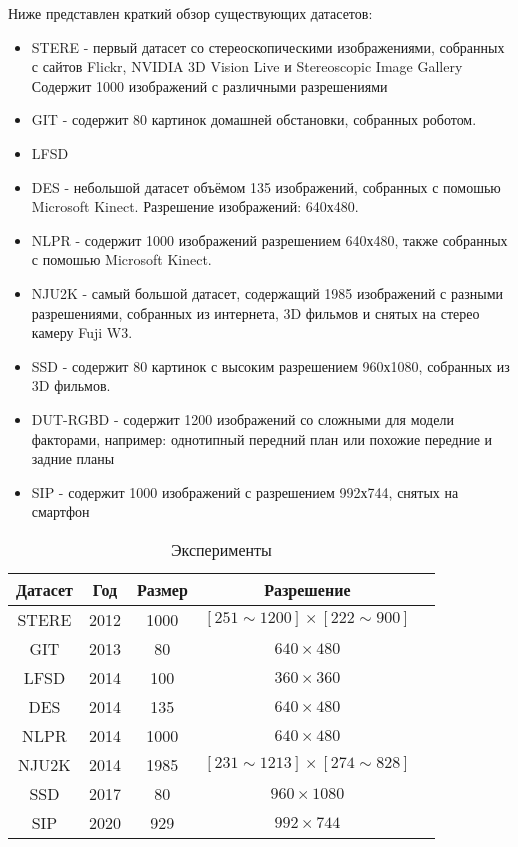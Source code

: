 Ниже представлен краткий обзор существующих датасетов:
\begin{itemize}
    \item STERE \cite{STERE} - первый датасет со стереоскопическими изображениями, собранных с сайтов Flickr, NVIDIA 3D Vision Live и Stereoscopic Image Gallery
    Содержит 1000 изображений с различными разрешениями
    \item GIT \cite{GIT} - содержит 80 картинок домашней обстановки, собранных роботом.
    \item LFSD \cite{LFSD}
    \item DES \cite{DES} - небольшой датасет объёмом 135 изображений, собранных с помошью Microsoft Kinect. Разрешение изображений: 640х480.
    \item NLPR \cite{NLPR} - содержит 1000 изображений разрешением 640х480, также собранных с помошью Microsoft Kinect.
    \item NJU2K \cite{NJU2K} - самый большой датасет, содержащий 1985 изображений с разными разрешениями, собранных из интернета, 3D фильмов и снятых на стерео камеру Fuji W3.
    \item SSD \cite{SSD} - содержит 80 картинок с высоким разрешением 960х1080, собранных из 3D фильмов.
    \item DUT-RGBD \cite{DUT} - содержит 1200 изображений со сложными для модели факторами, например: однотипный передний план или похожие передние и задние планы
    \item SIP \cite{Rethinking-RGBD} - содержит 1000 изображений с разрешением 992х744, снятых на смартфон
\end{itemize}


\begin{center}
    \begin{table}
        \begin{tabular}{|c|c|c|c|c|} 
            \hline
            Датасет & Год & Размер & Разрешение\\
            \hline
            \hline
            STERE\cite{STERE} & 2012 & 1000 & $[251 \sim 1200] \times [222 \sim 900]$ \\
            \hline
            GIT\cite{GIT} & 2013 & 80 & $640 \times 480$ \\
            \hline
            LFSD\cite{LFSD} & 2014 & 100 & $360 \times 360$ \\
            \hline
            DES\cite{DES} & 2014 & 135 & $640 \times 480$  \\
            \hline
            NLPR\cite{NLPR} & 2014 & 1000 &  $640 \times 480$ \\
            \hline
            NJU2K\cite{NJU2K} & 2014 & 1985 & $[231 \sim 1213] \times [274 \sim 828]$\\
            \hline
            SSD\cite{SSD} & 2017 & 80 & $960 \times 1080$\\
            \hline
            SIP\cite{Rethinking-RGBD} & 2020 & 929 &  $992 \times 744$\\
            \hline
        \end{tabular}
    \caption{Эксперименты}
    \label{tab:datasets}
    \end{table}
\end{center}

